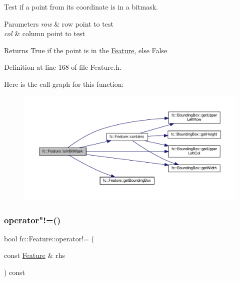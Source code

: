 Test if a point from its coordinate is in a bitmask. 


\begin{DoxyParams}{Parameters}
{\em row} & row point to test \\
\hline
{\em col} & column point to test \\
\hline
\end{DoxyParams}
\begin{DoxyReturn}{Returns}
True if the point is in the \hyperlink{classfc_1_1Feature}{Feature}, else False 
\end{DoxyReturn}


Definition at line 168 of file Feature.\+h.

Here is the call graph for this function\+:
\nopagebreak
\begin{figure}[H]
\begin{center}
\leavevmode
\includegraphics[width=350pt]{d7/d71/classfc_1_1Feature_a8cd5e2721373377bb80d87dd72265f98_cgraph}
\end{center}
\end{figure}
\mbox{\label{classfc_1_1Feature_a04bfee2095c243b512be2fc53b0ea08c}} 
\subsubsection{\texorpdfstring{operator"!=()}{operator!=()}}
{\footnotesize\ttfamily bool fc\+::\+Feature\+::operator!= (\begin{DoxyParamCaption}\item[{const \hyperlink{classfc_1_1Feature}{Feature} \&}]{rhs }\end{DoxyParamCaption}) const\hspace{0.3cm}{\ttfamily [inline]}}



